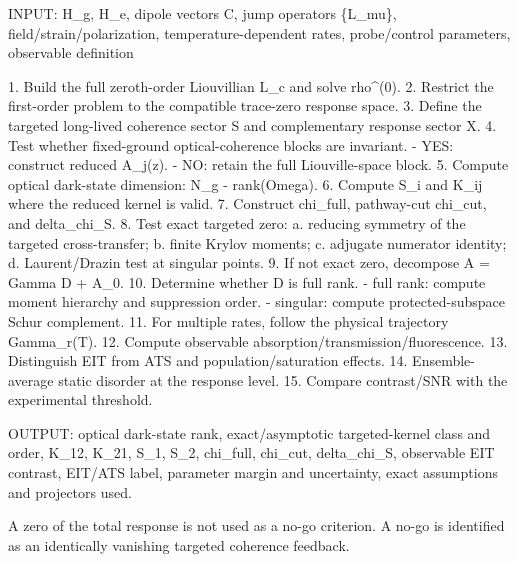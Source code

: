 \documentclass[
  10pt,
  a4paper,
]{article}
\newenvironment{Shaded}{}{}
\newcommand{\NormalTok}[1]{#1}
\begin{document}
\begin{Shaded}
\begin{Highlighting}[]
\NormalTok{INPUT:}
\NormalTok{  H\_g, H\_e, dipole vectors C, jump operators \{L\_mu\},}
\NormalTok{  field/strain/polarization, temperature{-}dependent rates,}
\NormalTok{  probe/control parameters, observable definition}

\NormalTok{1. Build the full zeroth{-}order Liouvillian L\_c and solve rho\^{}(0).}
\NormalTok{2. Restrict the first{-}order problem to the compatible trace{-}zero response space.}
\NormalTok{3. Define the targeted long{-}lived coherence sector S and complementary response sector X.}
\NormalTok{4. Test whether fixed{-}ground optical{-}coherence blocks are invariant.}
\NormalTok{   {-} YES: construct reduced A\_j(z).}
\NormalTok{   {-} NO: retain the full Liouville{-}space block.}
\NormalTok{5. Compute optical dark{-}state dimension: N\_g {-} rank(Omega).}
\NormalTok{6. Compute S\_i and K\_ij where the reduced kernel is valid.}
\NormalTok{7. Construct chi\_full, pathway{-}cut chi\_cut, and delta\_chi\_S.}
\NormalTok{8. Test exact targeted zero:}
\NormalTok{   a. reducing symmetry of the targeted cross{-}transfer;}
\NormalTok{   b. finite Krylov moments;}
\NormalTok{   c. adjugate numerator identity;}
\NormalTok{   d. Laurent/Drazin test at singular points.}
\NormalTok{9. If not exact zero, decompose A = Gamma D + A\_0.}
\NormalTok{10. Determine whether D is full rank.}
\NormalTok{    {-} full rank: compute moment hierarchy and suppression order.}
\NormalTok{    {-} singular: compute protected{-}subspace Schur complement.}
\NormalTok{11. For multiple rates, follow the physical trajectory Gamma\_r(T).}
\NormalTok{12. Compute observable absorption/transmission/fluorescence.}
\NormalTok{13. Distinguish EIT from ATS and population/saturation effects.}
\NormalTok{14. Ensemble{-}average static disorder at the response level.}
\NormalTok{15. Compare contrast/SNR with the experimental threshold.}

\NormalTok{OUTPUT:}
\NormalTok{  optical dark{-}state rank,}
\NormalTok{  exact/asymptotic targeted{-}kernel class and order,}
\NormalTok{  K\_12, K\_21, S\_1, S\_2,}
\NormalTok{  chi\_full, chi\_cut, delta\_chi\_S,}
\NormalTok{  observable EIT contrast,}
\NormalTok{  EIT/ATS label,}
\NormalTok{  parameter margin and uncertainty,}
\NormalTok{  exact assumptions and projectors used.}
\end{Highlighting}
\end{Shaded}

A zero of the total response is not used as a no-go criterion. A no-go
is identified as an identically vanishing targeted coherence feedback.
\end{document}
